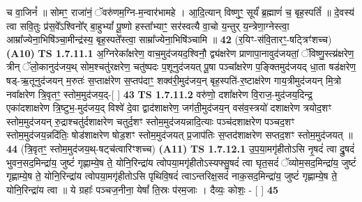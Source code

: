 \documentclass[17pt]{extarticle}
\begin{document}
                  च वा॒जिनं᳚ ॥ सोमꣳ॒॒ राजा॑नं॒ ॅवरु॑णम॒ग्नि-म॒न्वार॑भामहे । आ॒दि॒त्यान् विष्णुꣳ॒॒ सूर्यं॑ ब्र॒ह्माणं॑ च॒ बृह॒स्पतिं᳚ ॥ दे॒वस्य॑ त्वा सवि॒तुः प्र॑स॒वे᳚ऽश्विनो᳚र् बा॒हुभ्यां᳚ पू॒ष्णो हस्ता᳚भ्याꣳ॒॒ सर॑स्वत्यै वा॒चो य॒न्तुर् य॒न्त्रेणा॒ग्नेस्त्वा॒ आम्रा᳚ज्येना॒भिषि॑ञ्चा॒मीन्द्र॑स्य॒ बृह॒स्पते᳚स्त्वा॒ साम्रा᳚ज्येना॒भिषि॑ञ्चामि ॥ \textbf{  42} \newline
                  \newline
                      (र॒यिꣳ-स॑वि॒तारꣳ॒॒-षट्त्रिꣳ॑शच्च)  \textbf{(A10)} \newline \newline
                                        \textbf{ TS 1.7.11.1} \newline
                  अ॒ग्निरेका᳚क्षरेण॒ वाच॒मुद॑जयद॒श्विनौ॒ द्व्य॑क्षरेण प्राणापा॒नावुद॑जयतां॒ ॅविष्णु॒स्त्य्र॑क्षरेण॒ त्रीन् ॅलो॒कानुद॑जय॒थ् सोम॒श्चतु॑रक्षरेण॒ चतु॑ष्पदः प॒शूनुद॑जयत् पू॒षा पञ्चा᳚क्षरेण प॒ङ्क्तिमुद॑जयद् धा॒ता षड॑क्षरेण॒ षड्-ऋ॒तूनुद॑जयन् म॒रुतः॑ स॒प्ताक्ष॑रेण स॒प्तप॑दाꣳ॒॒ शक्व॑री॒मुद॑जय॒न् बृह॒स्पति॑-र॒ष्टाक्ष॑रेण गाय॒त्रीमुद॑जयन् मि॒त्रो नवा᳚क्षरेण त्रि॒वृतꣳ॒॒ स्तोम॒मुद॑जय॒द्-[ ] \textbf{  43} \newline
                  \newline
                                \textbf{ TS 1.7.11.2} \newline
                  वरु॑णो॒ दशा᳚क्षरेण वि॒राज॒-मुद॑जय॒दिन्द्र॒ एका॑दशाक्षरेण त्रि॒ष्टुभ॒-मुद॑जय॒द् विश्वे॑ दे॒वा द्वाद॑शाक्षरेण॒ जग॑ती॒मुद॑जय॒न् वस॑व॒स्त्रयो॑ दशाक्षरेण त्रयोद॒शꣳ स्तोम॒मुद॑जयन् रु॒द्राश्चतु॑र्दशाक्षरेण चतुर्द॒शꣳ स्तोम॒मुद॑जयन्नादि॒त्याः पञ्च॑दशाक्षरेण पञ्चद॒शꣳ स्तोम॒मुद॑जय॒न्नदि॑तिः॒ षोड॑शाक्षरेण षोड॒शꣳ स्तोम॒मुद॑जयत् प्र॒जाप॑तिः स॒प्तद॑शाक्षरेण सप्तद॒शꣳ स्तोम॒मुद॑जयत् ॥ \textbf{  44} \newline
                  \newline
                      (त्रि॒वृतꣳ॒॒ स्तोम॒मुद॑जय॒थ्-षट्च॑त्वारिꣳशच्च)  \textbf{(A11)} \newline \newline
                                        \textbf{ TS 1.7.12.1} \newline
                  उ॒प॒या॒मगृ॑हीतोऽसि नृ॒षदं॑ त्वा द्रु॒षदं॑ भुवन॒सद॒मिन्द्रा॑य॒ जुष्टं॑ गृह्णाम्ये॒ष ते॒ योनि॒रिन्द्रा॑य त्वोपया॒मगृ॑हीतोऽस्यफ्सु॒षदं॑ त्वा घृत॒सदं॑ ॅव्योम॒सद॒मिन्द्रा॑य॒ जुष्टं॑ गृह्णाम्ये॒ष ते॒ योनि॒रिन्द्रा॑य त्वोपया॒मगृ॑हीतोऽसि पृथिवि॒षदं॑ त्वाऽन्तरिक्ष॒सदं॑ नाक॒सद॒मिन्द्रा॑य॒ जुष्टं॑ गृह्णाम्ये॒ष ते॒ योनि॒रिन्द्रा॑य त्वा ॥ ये ग्रहाः᳚ पञ्चज॒नीना॒ येषां᳚ ति॒स्रः प॑रम॒जाः । दैव्यः॒ कोशः॒ - [ ] \textbf{  45} \newline
\end{document}
